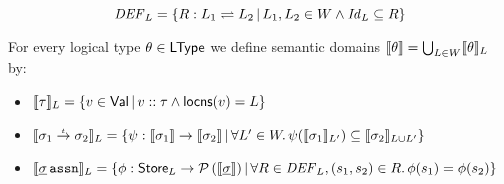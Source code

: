 \documentclass[12pt,a4paper]{article}
\begin{document}
\[
\mathit{DEF}_L = \{R:L_1 \rightleftharpoons L_2\,|\,L_1,L_2\in W \wedge \mathit{Id}_L \subseteq R\}
\]

\begin{definition}
  For every logical type $\theta \in \mathsf{LType}$ we define semantic domains
  $\llbracket\theta\rrbracket = \bigcup_{L\in W} \llbracket\theta\rrbracket_L$ by:
  \begin{itemize}
  \item $\llbracket\tau\rrbracket_L
    = \{v \in \mathsf{Val}\,|\,{v}\mathrel{::}{\tau} \wedge \mathsf{locns}(v) = L\}$
  \item $\llbracket\sigma_1\stackrel{_t}{\to}\sigma_2\rrbracket_L
    = \{\psi:\llbracket\sigma_1\rrbracket\to\llbracket\sigma_2\rrbracket\,|\,
    \forall L'\in W.\,\psi(\llbracket\sigma_1\rrbracket_{L'}) \subseteq \llbracket\sigma_2\rrbracket_{L \cup L'}\}$
  \item $\llbracket\underline{\sigma}\,\mathtt{assn}\rrbracket_L
    = \{\phi:\mathsf{Store}_L \to \mathcal{P}\,(\llbracket\underline{\sigma}\rrbracket)\,|\,
    \forall R\in \mathit{DEF}_L, (s_1,s_2)\in R.\, \phi(s_1) = \phi(s_2)\}$
  \end{itemize}
\end{definition}
\end{document}
